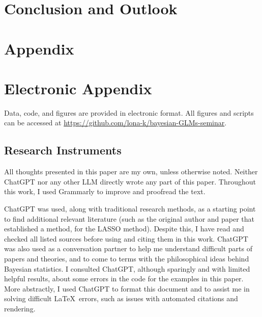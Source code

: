 \documentclass[12pt]{article}
\begin{document}
\section{Conclusion and Outlook}
\label{sec:conclusion}


\newpage



\setcounter{page}{5} %

\appendix

\section{Appendix}
\label{sec:app}

\newpage

\section{Electronic Appendix}
\label{sec:el_app}

Data, code, and figures are provided in electronic format. All figures and scripts can be accessed at \url{https://github.com/lona-k/bayesian-GLMs-seminar}.

\newpage


\RaggedRight



\subsection*{Research Instruments}

All thoughts presented in this paper are my own, unless otherwise noted.
Neither ChatGPT nor any other LLM directly wrote any part of this paper.
Throughout this work, I used Grammarly \citep{grammarly} to improve and proofread the text.

ChatGPT \citep{chatgpt} was used, along with traditional research methods, as a starting point to find additional relevant literature (such as the original author and paper that established a method, 
\citet[e.g.][]{tibshirani_regression_1996} for the LASSO method). Despite this, I have read and checked all listed sources before using and citing them in this work.
ChatGPT was also used as a conversation partner to help me understand difficult parts of papers and theories, and to come to terms with the philosophical ideas behind Bayesian statistics. I consulted ChatGPT, although sparingly and with limited helpful results, about some errors in the code for the examples in this paper.
More abstractly, I used ChatGPT to format this document and to assist me in solving difficult \LaTeX \ errors, such as issues with automated citations and rendering.
\end{document}

